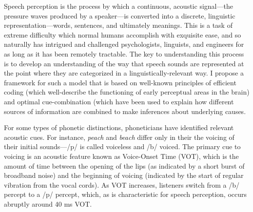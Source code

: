 \documentclass[12pt]{article}
\begin{document}
Speech perception is the process by which a continuous, acoustic signal---the pressure waves produced by a speaker---is converted into a discrete, linguistic representation---words, sentences, and ultimately meanings.  This is a task of extreme difficulty which normal humans accomplish with exquisite ease, and so naturally has intrigued and challenged psychologists, linguists, and engineers for as long as it has been remotely tractable.  The key to understanding this process is to develop an understanding of the way that speech sounds are represented at the point where they are categorized in a linguistically-relevant way.  I propose a framework for such a model that is based on well-known principles of efficient coding (which well-describe the functioning of early perceptual areas in the brain) and optimal cue-combination (which have been used to explain how different sources of information are combined to make inferences about underlying causes.


For some types of phonetic distinctions, phoneticians have identified relevant acoustic cues.  For instance, \emph{peach} and \emph{beach} differ only in their the voicing of their initial sounds---/p/ is called voiceless and /b/ voiced.  The primary cue to voicing is an acoustic feature known as Voice-Onset Time (VOT), which is the amount of time between the opening of the lips (as indicated by a short burst of broadband noise) and the beginning of voicing (indicated by the start of regular vibration from the vocal cords).  As VOT increases, listeners switch from a /b/ percept to a /p/ percept, which, as is characteristic for speech perception, occurs abruptly around 40 ms VOT.
\end{document}
